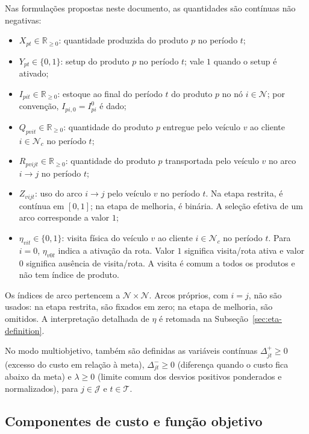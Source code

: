 \documentclass[11pt,a4paper]{article}
\newcommand{\N}{\mathcal{N}}
\newcommand{\Tset}{\mathcal{T}}
\begin{document}
Nas formulações propostas neste documento, as quantidades são contínuas não negativas:
\begin{itemize}
    \item $X_{pt}\in\mathbb R_{\ge0}$: quantidade produzida do produto $p$ no período $t$;
    \item $Y_{pt}\in\{0,1\}$: setup do produto $p$ no período $t$; vale $1$ quando o setup é ativado;
    \item $I_{pit}\in\mathbb R_{\ge0}$: estoque ao final do período $t$ do produto $p$ no nó $i\in\N$; por convenção, $I_{pi,0}=I^0_{pi}$ é dado;
    \item $Q_{pvit}\in\mathbb R_{\ge0}$: quantidade do produto $p$ entregue pelo veículo $v$ ao cliente $i\in\N_c$ no período $t$;
    \item $R_{pvijt}\in\mathbb R_{\ge0}$: quantidade do produto $p$ transportada pelo veículo $v$ no arco $i\to j$ no período $t$;
    \item $Z_{vijt}$: uso do arco $i\to j$ pelo veículo $v$ no período $t$. Na etapa restrita, é contínua em $[0,1]$; na etapa de melhoria, é binária. A seleção efetiva de um arco corresponde a valor $1$;
    \item $\eta_{vit}\in\{0,1\}$: visita física do veículo $v$ ao cliente $i\in\N_c$ no período $t$. Para $i=0$, $\eta_{v0t}$ indica a ativação da rota. Valor $1$ significa visita/rota ativa e valor $0$ significa ausência de visita/rota. A visita é comum a todos os produtos e não tem índice de produto.
\end{itemize}
Os índices de arco pertencem a $\N\times\N$. Arcos próprios, com $i=j$, não são usados: na etapa restrita, são fixados em zero; na etapa de melhoria, são omitidos. A interpretação detalhada de $\eta$ é retomada na Subseção~\ref{sec:eta-definition}.

No modo multiobjetivo, também são definidas as variáveis contínuas $\Delta^+_{jt}\ge0$ (excesso do custo em relação à meta), $\Delta^-_{jt}\ge0$ (diferença quando o custo fica abaixo da meta) e $\lambda\ge0$ (limite comum dos desvios positivos ponderados e normalizados), para $j\in\mathcal J$ e $t\in\Tset$.

\subsection{Componentes de custo e função objetivo}
\end{document}
